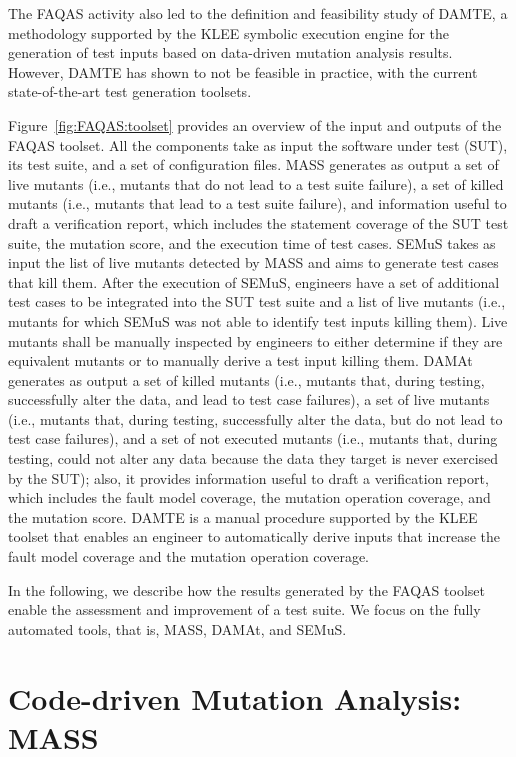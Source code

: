 The FAQAS activity also led to the definition and feasibility study of DAMTE, a methodology supported by the KLEE symbolic execution engine for the generation of test inputs based on data-driven mutation analysis results. However, DAMTE has shown to not be feasible in practice, with the current state-of-the-art test generation toolsets.

Figure~\ref{fig:FAQAS:toolset} provides an overview of the input and outputs of the FAQAS toolset. All the components take as input the software under test (SUT), its test suite, and a set of configuration files.
MASS generates as output a set of live mutants (i.e., mutants that do not lead to a test suite failure), a set of killed mutants (i.e., mutants that lead to a test suite failure), and information useful to draft a verification report, which includes the statement coverage of the SUT test suite, the mutation score, and the execution time of test cases.
SEMuS takes as input the list of live mutants detected by MASS and aims to generate test cases that kill them. After the
 execution of SEMuS, engineers have a set of additional test cases to be integrated into the SUT test suite and a list of live mutants (i.e., mutants for which SEMuS was not able to identify test inputs killing them). Live mutants shall be manually inspected by engineers to either determine if they are equivalent mutants or to manually derive a test input killing them.
 DAMAt generates as output a set of killed mutants (i.e., mutants that, during testing, successfully alter the data, and lead to test case failures), a set of live mutants (i.e., mutants that, during testing, successfully alter the data, but do not lead to test case failures), and a set of not executed mutants (i.e., mutants that, during testing, could not alter any data because the data they target is never exercised by the SUT); also, it provides information useful to draft a verification report, which includes the fault model coverage, the mutation operation coverage, and the mutation score.
 DAMTE is a manual procedure supported by the KLEE toolset that enables an engineer to automatically derive inputs that increase the fault model coverage and the mutation operation coverage.

In the following, we describe how the results generated by the FAQAS toolset enable the assessment and improvement of a test suite.
We focus on the fully automated tools, that is, MASS, DAMAt, and SEMuS.


\section{Code-driven Mutation Analysis: MASS}
\label{sec:meth:mass}

